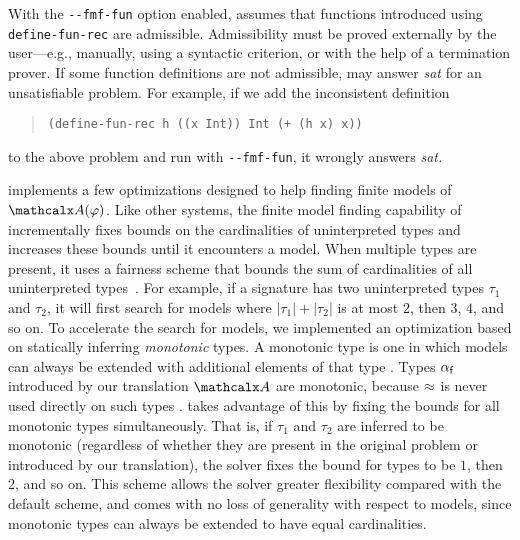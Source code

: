 With the \texttt{-}\texttt{-fmf-fun} option enabled, \cvc assumes that
functions introduced using \texttt{define-\allowbreak fun-\allowbreak rec} are admissible.
Admissibility must be proved externally by the user---e.g., manually, using a
syntactic criterion, or with the help of a termination prover.
If some function definitions are not admissible, \cvc may answer \emph{sat} for
an unsatisfiable problem. For example, if we add the inconsistent definition
%
\begin{quote}
\begin{verbatim}
(define-fun-rec h ((x Int)) Int (+ (h x) x))
\end{verbatim}
\end{quote}
%
to the above problem and run \cvc with \texttt{-}\texttt{-fmf-fun},
it wrongly answers \emph{sat.}

\cvc implements a few optimizations designed to help finding finite models of
$\conv(\varphi)$.
Like other systems,
the finite model finding capability of \cvc incrementally fixes bounds on the cardinalities of uninterpreted types
and increases these bounds until it encounters a model.
When multiple types are present, it uses a fairness scheme that
bounds the sum of cardinalities of all uninterpreted types~\cite{reynolds2013finite}.
For example, if a signature has two uninterpreted types $\tau_1$ and $\tau_2$,
it will first search for models where
$\left\vert\tau_1\right\vert + \left\vert\tau_2\right\vert$ is at most $2$,
then $3$, $4$, and so on.
To accelerate the search for models,
we implemented an optimization based on statically inferring \emph{monotonic} types.
A monotonic type is one in which models can always be extended with additional
elements of that type \cite{blanchette-krauss-2011,claessen-et-al-2011}.
Types $\alpha_{\mathsf{f}}$ introduced by our translation $\conv$ are monotonic,
because $\approx$ is never used directly on such types \cite{claessen-et-al-2011}.
%
\cvc takes advantage of this by fixing the bounds for all
monotonic types simultaneously.
That is, if $\tau_1$ and $\tau_2$ are inferred to be monotonic (regardless
of whether they are present in the original problem or introduced by our translation),
the solver fixes the bound for  types to be $1$, then $2$, and so on.
This scheme allows the solver greater flexibility compared with the default scheme,
and comes with no loss of generality with respect to models,
since monotonic types can always be extended to have equal cardinalities.

